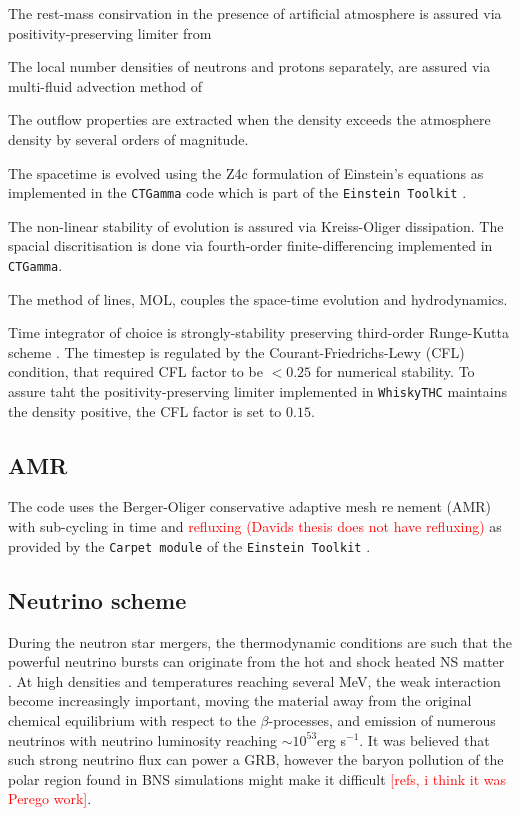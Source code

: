 \documentclass[11pt,a4paper,headinclude=true,DIV=14,BCOR=8mm,chapterprefix,listof=totoc,twoside,openright,abstracton]{scrbook}
\newcommand{\red}[1]{\textcolor{red}{#1}}
\begin{document}
The rest-mass consirvation in the presence of artificial atmosphere is assured via 
positivity-preserving limiter from \cite{Radice:2013xpa}

The local number densities of neutrons and protons separately, are assured via 
multi-fluid advection method of \cite{Plewa:1998nma}

The outflow properties are extracted when the density exceeds the atmosphere density
by several orders of magnitude.

The spacetime is evolved using the Z4c formulation of Einstein's equations
\cite{Bernuzzi:2009ex,Hilditch:2012fp} as implemented in the \texttt{CTGamma} code
\cite{Pollney:2009yz,Reisswig:2013sqa} which is part of the \texttt{Einstein Toolkit} 
\cite{Loffler:2011ay}.

The non-linear stability of evolution is assured via Kreiss-Oliger dissipation. 
The spacial discritisation is done via fourth-order finite-differencing implemented in \texttt{CTGamma}.

The method of lines, MOL, couples the space-time evolution and hydrodynamics. 

Time integrator of choice is strongly-stability preserving third-order Runge-Kutta scheme \cite{Gottlieb:2009}.
The timestep is regulated by the Courant-Friedrichs-Lewy (CFL) condition, that required CFL factor 
to be $<0.25$ for numerical stability. To assure taht the positivity-preserving limiter implemented in \texttt{WhiskyTHC} maintains the density positive, the CFL factor is set to $0.15$.


\subsection{AMR}

The code uses the Berger-Oliger conservative adaptive mesh renement (AMR) \cite{Berger:1984} with 
sub-cycling in time and \red{refluxing (Davids thesis does not have refluxing)} \cite{Berger:1989,Reisswig:2012nc} as provided by the \texttt{Carpet module} of the \texttt{Einstein Toolkit} 
\cite{Schnetter:2003rb}. 



\subsection{Neutrino scheme}

During the neutron star mergers, the thermodynamic conditions are such that the powerful 
neutrino bursts can originate from the hot and shock heated NS matter \cite{Sekiguchi:2011zd}.
At high densities and temperatures reaching several MeV, the weak interaction become increasingly important, moving the material away from the original chemical equilibrium with respect to the 
$\beta$-processes, and emission of numerous neutrinos with neutrino luminosity reaching $\sim10^{53}$erg s$^{-1}$. 
It was believed that such strong neutrino flux can power a GRB, however the baryon pollution of the polar region found in BNS simulations might make it difficult \red{[refs, i think it was Perego work]}.
\end{document}
